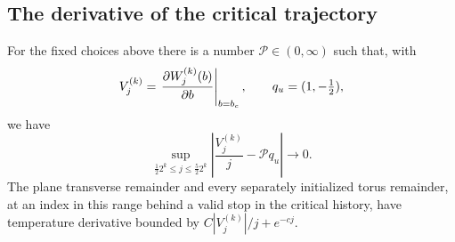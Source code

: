 \subsection{The derivative of the critical trajectory}

\begin{proposition}\label{prop:response}
For the fixed choices above there is a number
\(\mathcal P\in(0,\infty)\) such that, with
\[
 V_j^{(k)}=
 \left.\frac{\partial W_j^{(k)}(b)}{\partial b}\right|_{b=b_c},
 \qquad q_u=(1,-\tfrac12),
\]
we have
\begin{equation}\label{eq:traj-response-limit}
 \sup_{\frac12 2^k\le j\le\frac52 2^k}
 \left|\frac{V_j^{(k)}}j-\mathcal Pq_u\right|
 \longrightarrow0.
\end{equation}
The plane transverse remainder and every separately initialized
torus remainder, at an index in this range behind a valid stop in
the critical history, have temperature derivative bounded by
\(C|V_j^{(k)}|/j+e^{-cj}\).
\end{proposition}

